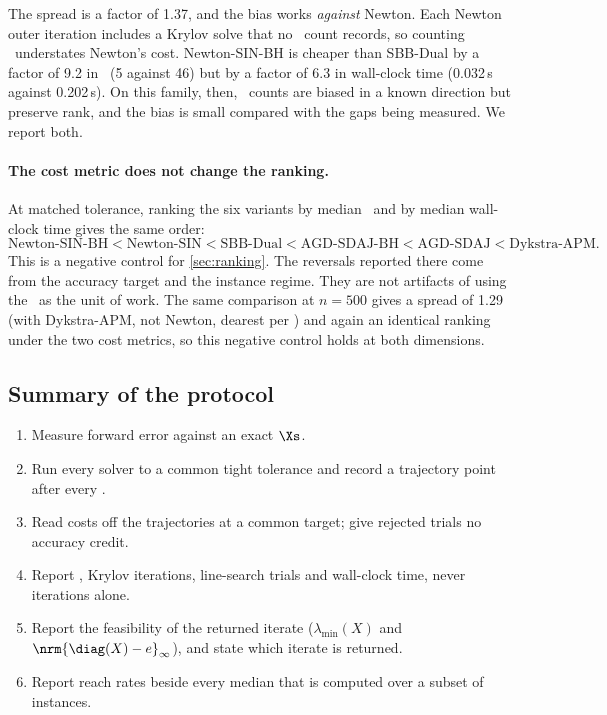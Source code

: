 

The spread is a factor of 1.37, and the bias works \emph{against} Newton. Each
Newton outer iteration includes a Krylov solve that no \EVD\ count records, so
counting \EVDs\ understates Newton's cost. Newton-SIN-BH is cheaper than
SBB-Dual by a factor of 9.2 in \EVDs\ (5 against 46) but by a factor of 6.3 in
wall-clock time (0.032\,s against 0.202\,s). On this family, then, \EVD\
counts are biased in a known direction but preserve rank, and the bias is
small compared with the gaps being measured. We report both.

\paragraph{The cost metric does not change the ranking.}
At matched tolerance, ranking the six variants by median \EVDs\ and by median
wall-clock time gives the same order:
\[
  \text{Newton-SIN-BH} < \text{Newton-SIN} < \text{SBB-Dual} < \text{AGD-SDAJ-BH} < \text{AGD-SDAJ} < \text{Dykstra-APM}.
\]
This is a negative control for \cref{sec:ranking}. The reversals reported
there come from the accuracy target and the instance regime. They are not
artifacts of using the \EVD\ as the unit of work.
The same comparison at $n=500$ gives a spread of 1.29 (with Dykstra-APM, not
Newton, dearest per \EVD) and again an identical ranking under the two cost
metrics, so this negative control holds at both dimensions.

\subsection{Summary of the protocol}
\begin{enumerate}
  \item Measure forward error against an exact $\Xs$.
  \item Run every solver to a common tight tolerance and record a trajectory
    point after every \EVD.
  \item Read costs off the trajectories at a common target; give rejected
    trials no accuracy credit.
  \item Report \EVDs, Krylov iterations, line-search trials and wall-clock
    time, never iterations alone.
  \item Report the feasibility of the returned iterate
    ($\lambda_{\min}(X)$ and $\nrm{\diag(X)-e}_\infty$), and state which
    iterate is returned.
  \item Report reach rates beside every median that is computed over a
    subset of instances.
\end{enumerate}

